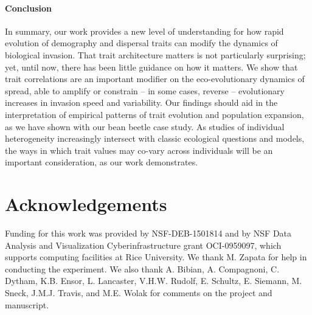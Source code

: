 \documentclass[11pt]{article}
\begin{document}
\paragraph*{Conclusion}
In summary, our work provides a new level of understanding for how rapid evolution of demography and dispersal traits can modify the dynamics of biological invasion.
That trait architecture matters is not particularly surprising; yet, until now, there has been little guidance on how it matters. 
We show that trait correlations are an important modifier on the eco-evolutionary dynamics of spread, able to amplify or constrain -- in some cases, reverse -- evolutionary increases in invasion speed and variability. 
Our findings should aid in the interpretation of empirical patterns of trait evolution and population expansion, as we have shown with our bean beetle case study. 
As studies of individual heterogeneity increasingly intersect with classic ecological questions and models, the ways in which trait values may co-vary across individuals will be an important consideration, as our work demonstrates. 

\section*{Acknowledgements}
Funding for this work was provided by NSF-DEB-1501814 and by NSF Data Analysis and Visualization Cyberinfrastructure grant OCI-0959097, which supports computing facilities at Rice University. We thank M. Zapata for help in conducting the experiment. We also thank A. Bibian, A. Compagnoni, C. Dytham, K.B. Ensor, L. Lancaster, V.H.W. Rudolf, E. Schultz, E. Siemann, M. Sneck, J.M.J. Travis, and M.E. Wolak for comments on the project and manuscript.

\newpage{}
\end{document}

